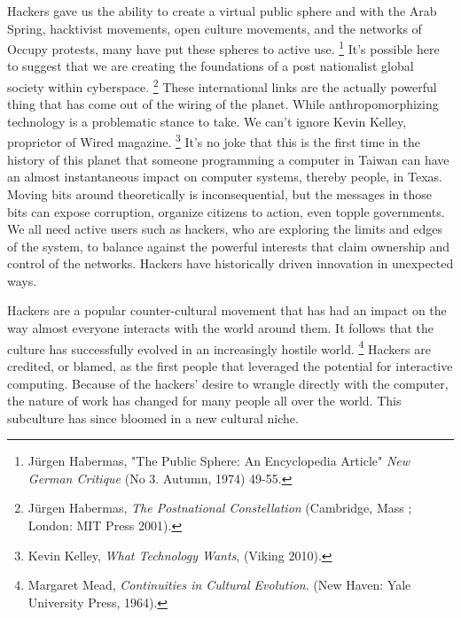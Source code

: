 \documentclass[11pt]{article}
\begin{document}
Hackers gave us the ability to create a virtual public sphere and with the Arab Spring, hacktivist movements, open culture movements, and the networks of Occupy protests, many have put these spheres to active use.
\footnote{J\"urgen Habermas, "The Public Sphere: An Encyclopedia Article" \emph{New German Critique} (No 3. Autumn, 1974) 49-55.}
It's possible here to suggest that we are creating the foundations  of a post nationalist global society within cyberspace.
\footnote{J\"urgen Habermas, \emph{The Postnational Constellation} (Cambridge, Mass ; London: MIT Press 2001).} These international links are the actually powerful thing that has come out of the wiring of the planet. While anthropomorphizing technology is a problematic stance to take. We can't ignore Kevin Kelley, proprietor of Wired magazine.
\footnote{Kevin Kelley, \emph{What Technology Wants}, (Viking 2010).} It's no joke that this is the first time in the history of this planet that someone programming a computer in Taiwan can have an almost instantaneous impact on computer systems, thereby people, in Texas. Moving bits around theoretically is inconsequential, but the messages in those bits can expose corruption, organize citizens to action, even topple governments. We all need active users such as hackers, who are exploring the limits and edges of the system, to balance against the powerful interests that claim ownership and control of the networks. Hackers have historically driven innovation in unexpected ways. 

Hackers are a popular counter-cultural movement that has had an impact on the way almost everyone interacts with the world around them. It follows that the culture has successfully evolved in an increasingly hostile world.
\footnote{Margaret Mead, \emph{Continuities in Cultural Evolution}. (New Haven: Yale University Press, 1964).}
Hackers are credited, or blamed, as the first people that leveraged the potential for interactive computing. Because of the hackers' desire to wrangle directly with the computer, the nature of work has changed for many people all over the world. This subculture has since bloomed in a new cultural niche.
\end{document}
